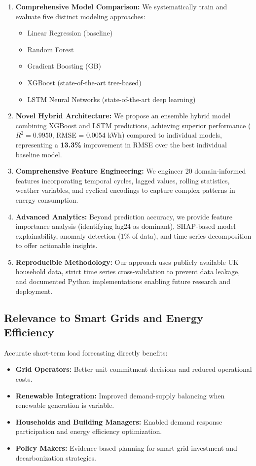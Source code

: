 \begin{enumerate}
    \item \textbf{Comprehensive Model Comparison:} We systematically train and evaluate five distinct modeling approaches:
    \begin{itemize}
        \item Linear Regression (baseline)
        \item Random Forest
        \item Gradient Boosting (GB)
        \item XGBoost (state-of-the-art tree-based)
        \item LSTM Neural Networks (state-of-the-art deep learning)
    \end{itemize}
    
    \item \textbf{Novel Hybrid Architecture:} We propose an ensemble hybrid model combining XGBoost and LSTM predictions, achieving superior performance ($R^2 = 0.9950$, RMSE = 0.0054 kWh) compared to individual models, representing a \textbf{13.3\%} improvement in RMSE over the best individual baseline model.
    
    \item \textbf{Comprehensive Feature Engineering:} We engineer 20 domain-informed features incorporating temporal cycles, lagged values, rolling statistics, weather variables, and cyclical encodings to capture complex patterns in energy consumption.
    
    \item \textbf{Advanced Analytics:} Beyond prediction accuracy, we provide feature importance analysis (identifying lag24 as dominant), SHAP-based model explainability, anomaly detection (1\% of data), and time series decomposition to offer actionable insights.
    
    \item \textbf{Reproducible Methodology:} Our approach uses publicly available UK household data, strict time series cross-validation to prevent data leakage, and documented Python implementations enabling future research and deployment.
\end{enumerate}


\subsection{Relevance to Smart Grids and Energy Efficiency}

Accurate short-term load forecasting directly benefits:
\begin{itemize}
    \item \textbf{Grid Operators:} Better unit commitment decisions and reduced operational costs.
    \item \textbf{Renewable Integration:} Improved demand-supply balancing when renewable generation is variable.
    \item \textbf{Households and Building Managers:} Enabled demand response participation and energy efficiency optimization.
    \item \textbf{Policy Makers:} Evidence-based planning for smart grid investment and decarbonization strategies\cite{Fang2012SmartGrid}.
\end{itemize}

